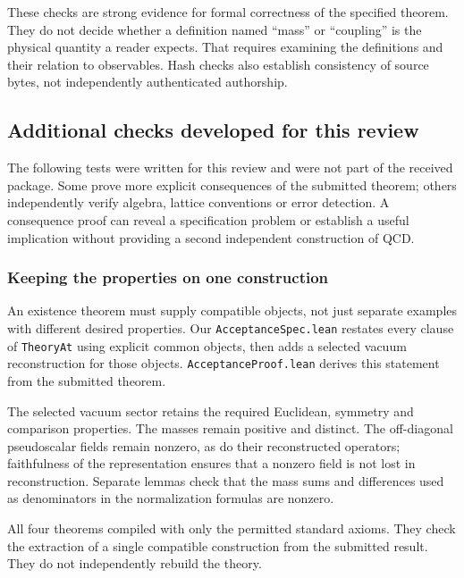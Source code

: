 \documentclass[
  11pt,
]{article}
\begin{document}
These checks are strong evidence for formal correctness of the specified
theorem. They do not decide whether a definition named ``mass'' or
``coupling'' is the physical quantity a reader expects. That requires
examining the definitions and their relation to observables. Hash checks
also establish consistency of source bytes, not independently
authenticated authorship.

\subsection{Additional checks developed for this
review}\label{additional-checks-developed-for-this-review}

The following tests were written for this review and were not part of
the received package. Some prove more explicit consequences of the
submitted theorem; others independently verify algebra, lattice
conventions or error detection. A consequence proof can reveal a
specification problem or establish a useful implication without
providing a second independent construction of QCD.

\subsubsection{Keeping the properties on one
construction}\label{keeping-the-properties-on-one-construction}

An existence theorem must supply compatible objects, not just separate
examples with different desired properties. Our
{\small \nolinkurl{AcceptanceSpec.lean}} restates every clause of
{\small \nolinkurl{TheoryAt}} using explicit common objects, then adds a
selected vacuum reconstruction for those objects.
{\small \nolinkurl{AcceptanceProof.lean}} derives this statement from
the submitted theorem.

The selected vacuum sector retains the required Euclidean, symmetry and
comparison properties. The masses remain positive and distinct. The
off-diagonal pseudoscalar fields remain nonzero, as do their
reconstructed operators; faithfulness of the representation ensures that
a nonzero field is not lost in reconstruction. Separate lemmas check
that the mass sums and differences used as denominators in the
normalization formulas are nonzero.

All four theorems compiled with only the permitted standard axioms. They
check the extraction of a single compatible construction from the
submitted result. They do not independently rebuild the theory.
\end{document}
